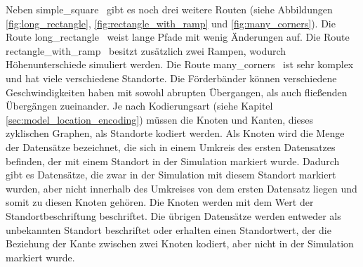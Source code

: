 \newpage
Neben \glqq simple\_square \grqq\ gibt es noch drei weitere Routen (siehe Abbildungen \ref{fig:long_rectangle}, \ref{fig:rectangle_with_ramp} und \ref{fig:many_corners}).
Die Route \glqq long\_rectangle \grqq\ weist lange Pfade mit wenig Änderungen auf.
Die Route \glqq rectangle\_with\_ramp \grqq\ besitzt zusätzlich zwei Rampen, wodurch Höhenunterschiede simuliert werden.
Die Route \glqq many\_corners \grqq\ ist sehr komplex und hat viele verschiedene Standorte.
Die Förderbänder können verschiedene Geschwindigkeiten haben mit sowohl abrupten Übergangen, als auch fließenden Übergängen zueinander.
\newline
\newline
Je nach Kodierungsart (siehe Kapitel \ref{sec:model_location_encoding}) müssen die Knoten und Kanten, dieses zyklischen Graphen, als Standorte kodiert werden.
Als Knoten wird die Menge der Datensätze bezeichnet, die sich in einem Umkreis des ersten Datensatzes befinden, der mit einem Standort in der Simulation markiert wurde.
Dadurch gibt es Datensätze, die zwar in der Simulation mit diesem Standort markiert wurden, aber nicht innerhalb des Umkreises von dem ersten Datensatz liegen
und somit zu diesen Knoten gehören.
Die Knoten werden mit dem Wert der Standortbeschriftung beschriftet.
Die übrigen Datensätze werden entweder als unbekannten Standort beschriftet oder erhalten einen Standortwert, der die Beziehung der Kante zwischen zwei Knoten kodiert,
aber nicht in der Simulation markiert wurde.
